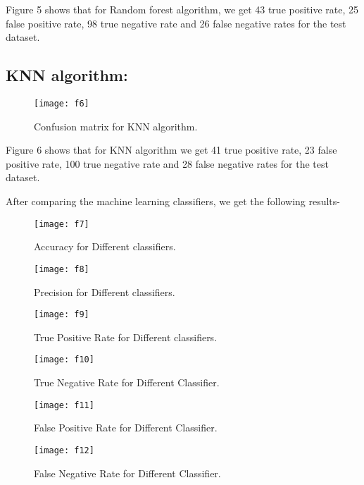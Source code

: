 \documentclass[conference]{IEEEtran}
\begin{document}
	Figure 5 shows that for Random forest algorithm, we get 43 true positive rate, 25 false positive rate, 98 true negative rate and 26 false negative rates for the test dataset.
	
\subsection{KNN algorithm:}

\begin{figure}[!h]
		\centering
		\texttt{[image: f6]}
		\caption{Confusion matrix for KNN algorithm.}
\end{figure}
	
	Figure 6 shows that for KNN algorithm we get 41 true positive rate, 23 false positive rate, 100 true negative rate and 28 false negative rates for the test dataset.
	
	
	After comparing the machine learning classifiers, we get the following results-
	
\begin{figure}[!h]
		\centering
		\texttt{[image: f7]}
		\caption{Accuracy for Different classifiers.}
\end{figure}
	
\begin{figure}[!h]
		\centering
		\texttt{[image: f8]}
		\caption{Precision for Different classifiers.}
\end{figure}
	
\begin{figure}[!h]
		\centering
		\texttt{[image: f9]}
		\caption{True Positive Rate for Different classifiers.}
\end{figure}
	
\begin{figure}[!h]
		\centering
		\texttt{[image: f10]}
		\caption{True Negative Rate for Different Classifier.}
\end{figure}
	
\begin{figure}[!h]
		\centering
		\texttt{[image: f11]}
		\caption{False Positive Rate for Different Classifier.}
\end{figure}
	
\begin{figure}[!h]
		\centering
		\texttt{[image: f12]}
		\caption{False Negative Rate for Different Classifier.}
\end{figure}
	
\end{document}
